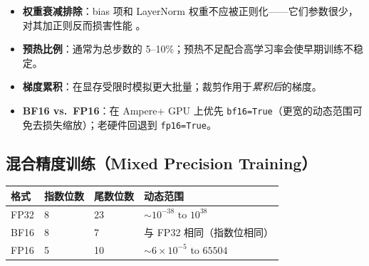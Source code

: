 \begin{keybox}[实践要点]
\begin{itemize}
  \item \textbf{权重衰减排除}：bias 项和 LayerNorm 权重不应被正则化——它们参数很少，对其加正则反而损害性能 \cite{loshchilov2019adamw}。
  \item \textbf{预热比例}：通常为总步数的 5--10\%；预热不足配合高学习率会使早期训练不稳定。
  \item \textbf{梯度累积}：在显存受限时模拟更大批量；裁剪作用于\emph{累积后}的梯度。
  \item \textbf{BF16 vs.~FP16}：在 Ampere+ GPU 上优先 \texttt{bf16=True}（更宽的动态范围可免去损失缩放）；老硬件回退到 \texttt{fp16=True}。
\end{itemize}
\end{keybox}

\subsection{混合精度训练（Mixed Precision Training）}
\label{mixed-precision-training}

\begin{keybox}[BF16 vs.\ FP16]
\begin{center}
\begin{tabular}{@{}l l l l@{}}
\toprule
\textbf{格式} & \textbf{指数位数} & \textbf{尾数位数} & \textbf{动态范围} \\
\midrule
FP32 & 8 & 23 & $\sim 10^{-38}$ to $10^{38}$ \\
BF16 & 8 & 7 & 与 FP32 相同（指数位相同） \\
FP16 & 5 & 10 & $\sim 6 \times 10^{-5}$ to $65504$ \\
\bottomrule
\end{tabular}
\end{center}
\end{keybox}

